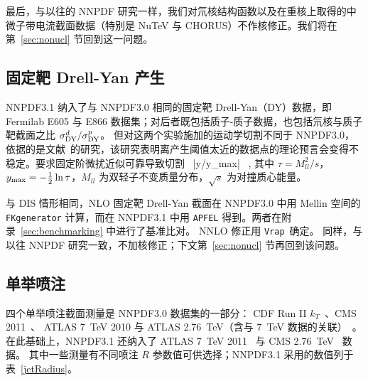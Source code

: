 最后，与以往的 NNPDF 研究一样，我们对氘核结构函数以及在重核上取得的中微子带电流截面数据（特别是 NuTeV 与 CHORUS）不作核修正。我们将在第~\ref{sec:nonucl} 节回到这一问题。


\subsection{固定靶 Drell-Yan 产生}

NNPDF3.1 纳入了与 NNPDF3.0 相同的固定靶 Drell-Yan（DY）数据，即 Fermilab E605 与 E866 数据集；对后者既包括质子-质子数据，也包括氘核与质子靶截面之比 $\sigma_{\rm DY}^d/\sigma_{\rm DY}^p$。
%
但对这两个实验施加的运动学切割不同于 NNPDF3.0，依据的是文献~\cite{Bonvini:2015ira}的研究，该研究表明离产生阈值太近的数据点的理论预言会变得不稳定。要求固定阶微扰近似可靠导致切割
\be
\tau {} \,  \quad |y/y_{\rm max}| \, ,
\ee
其中 $\tau=M_{ll}^2/s$，$y_{\rm max}=-\frac{1}{2} \ln \tau$，$M_{ll}$ 为双轻子不变质量分布，$\sqrt{s}$ 为对撞质心能量。


与 DIS 情形相同，NLO 固定靶 Drell-Yan 截面在 NNPDF3.0 中用 Mellin 空间的 {\tt FKgenerator} 计算，而在 NNPDF3.1 中用 {\tt APFEL} 得到。两者在附录~\ref{sec:benchmarking} 中进行了基准比对。
NNLO 修正用 {\tt Vrap}~\cite{Anastasiou:2003ds}确定。
%
同样，与以往 NNPDF 研究一致，不加核修正；下文第~\ref{sec:nonucl} 节再回到该问题。

\subsection{单举喷注}
\label{sec:datajets}

四个单举喷注截面测量是 NNPDF3.0 数据集的一部分：
CDF Run II $k_T$~\cite{Aaltonen:2008eq}、CMS 2011~\cite{Chatrchyan:2012bja}、
ATLAS 7~TeV 2010 与 ATLAS 2.76~TeV（含与 7~TeV 数据的关联）~\cite{Aad:2011fc,Aad:2013lpa}。
%
在此基础上，NNPDF3.1 还纳入了 ATLAS 7~TeV 2011~\cite{Aad:2014vwa} 与 CMS 2.76~TeV~\cite{Khachatryan:2015luy} 数据。
%
其中一些测量有不同喷注 $R$ 参数值可供选择；NNPDF3.1 采用的数值列于表~\ref{jetRadius}。

